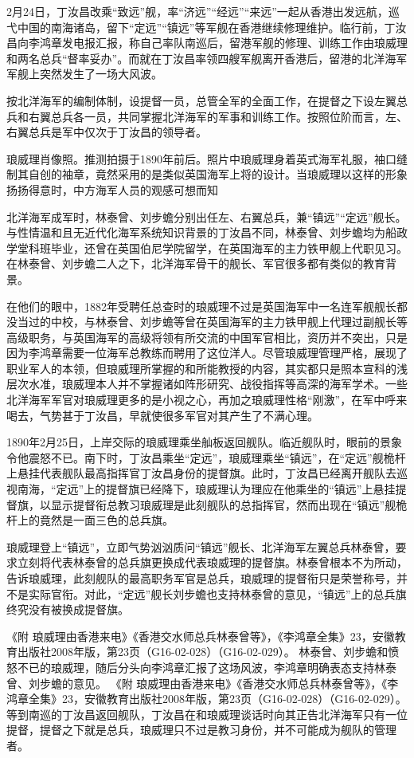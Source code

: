 \documentclass[12pt,UTF8]{ctexbook}
\begin{document}
2月24日，丁汝昌改乘“致远”舰，率“济远”“经远”“来远”一起从香港出发远航，巡弋中国的南海诸岛，留下“定远”“镇远”等军舰在香港继续修理维护。临行前，丁汝昌向李鸿章发电报汇报，称自己率队南巡后，留港军舰的修理、训练工作由琅威理和两名总兵“督率妥办”。而就在丁汝昌率领四艘军舰离开香港后，留港的北洋海军军舰上突然发生了一场大风波。

按北洋海军的编制体制，设提督一员，总管全军的全面工作，在提督之下设左翼总兵和右翼总兵各一员，共同掌握北洋海军的军事和训练工作。按照位阶而言，左、右翼总兵是军中仅次于丁汝昌的领导者。


琅威理肖像照。推测拍摄于1890年前后。照片中琅威理身着英式海军礼服，袖口缝制其自创的袖章，竟然采用的是类似英国海军上将的设计。当琅威理以这样的形象扬扬得意时，中方海军人员的观感可想而知

北洋海军成军时，林泰曾、刘步蟾分别出任左、右翼总兵，兼“镇远”“定远”舰长。与性情温和且无近代化海军系统知识背景的丁汝昌不同，林泰曾、刘步蟾均为船政学堂科班毕业，还曾在英国伯尼学院留学，在英国海军的主力铁甲舰上代职见习。在林泰曾、刘步蟾二人之下，北洋海军骨干的舰长、军官很多都有类似的教育背景。

在他们的眼中，1882年受聘任总查时的琅威理不过是英国海军中一名连军舰舰长都没当过的中校，与林泰曾、刘步蟾等曾在英国海军的主力铁甲舰上代理过副舰长等高级职务，与英国海军的高级将领有所交流的中国军官相比，资历并不突出，只是因为李鸿章需要一位海军总教练而聘用了这位洋人。尽管琅威理管理严格，展现了职业军人的本领，但琅威理所掌握的和所能教授的内容，其实都只是照本宣科的浅层次水准，琅威理本人并不掌握诸如阵形研究、战役指挥等高深的海军学术。一些北洋海军军官对琅威理更多的是小视之心，再加之琅威理性格“刚激”，在军中呼来喝去，气势甚于丁汝昌，早就使很多军官对其产生了不满心理。

1890年2月25日，上岸交际的琅威理乘坐舢板返回舰队。临近舰队时，眼前的景象令他震怒不已。南下时，丁汝昌乘坐“定远”，琅威理乘坐“镇远”，在“定远”舰桅杆上悬挂代表舰队最高指挥官丁汝昌身份的提督旗。此时，丁汝昌已经离开舰队去巡视南海，“定远”上的提督旗已经降下，琅威理认为理应在他乘坐的“镇远”上悬挂提督旗，以显示提督衔总教习琅威理是此刻舰队的总指挥官，然而出现在“镇远”舰桅杆上的竟然是一面三色的总兵旗。

琅威理登上“镇远”，立即气势汹汹质问“镇远”舰长、北洋海军左翼总兵林泰曾，要求立刻将代表林泰曾的总兵旗更换成代表琅威理的提督旗。林泰曾根本不为所动，告诉琅威理，此刻舰队的最高职务军官是总兵，琅威理的提督衔只是荣誉称号，并不是实际官衔。对此，“定远”舰长刘步蟾也支持林泰曾的意见，“镇远”上的总兵旗终究没有被换成提督旗。

《附 琅威理由香港来电》《香港交水师总兵林泰曾等》，《李鸿章全集》23，安徽教育出版社2008年版，第23页（G16-02-028）（G16-02-029）。
林泰曾、刘步蟾和愤怒不已的琅威理，随后分头向李鸿章汇报了这场风波，李鸿章明确表态支持林泰曾、刘步蟾的意见。 《附 琅威理由香港来电》《香港交水师总兵林泰曾等》，《李鸿章全集》23，安徽教育出版社2008年版，第23页（G16-02-028）（G16-02-029）。等到南巡的丁汝昌返回舰队，丁汝昌在和琅威理谈话时向其正告北洋海军只有一位提督，提督之下就是总兵，琅威理只不过是教习身份，并不可能成为舰队的管理者。
\end{document}
